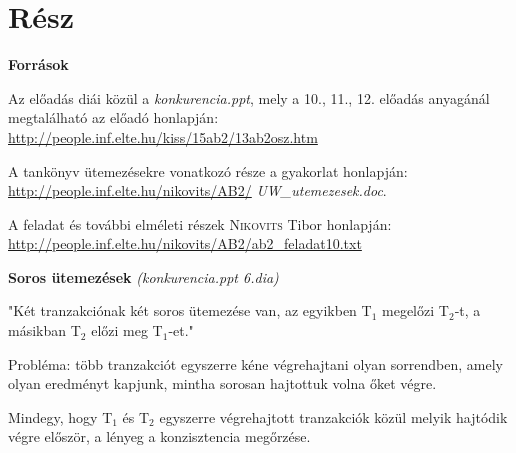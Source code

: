 \documentclass[a4paper,11.5pt, table]{article}
\begin{document}
\newpage

	\section{Rész}

	\textbf{Források}
	\begin{compactitem}
		\item Az előadás diái közül a \textit{konkurencia.ppt}, mely a 10., 11., 12. előadás anyagánál megtalálható az előadó honlapján: \url{http://people.inf.elte.hu/kiss/15ab2/13ab2osz.htm}
		 \item A tankönyv ütemezésekre vonatkozó része a gyakorlat honlapján: \url{http://people.inf.elte.hu/nikovits/AB2/} \textit{UW\_utemezesek.doc}.
		\item A feladat és további elméleti részek \textsc{Nikovits} Tibor honlapján: \url{http://people.inf.elte.hu/nikovits/AB2/ab2_feladat10.txt}
	\end{compactitem}

	\textbf{Soros ütemezések} \textit{(konkurencia.ppt 6.dia)}
	\begin{compactitem}
		\item "Két tranzakciónak két soros ütemezése van, az egyikben T$_{1}$ megelőzi T$_{2}$‑t, a másikban T$_{2}$ előzi meg T$_{1}$-et."
		
		\item Probléma: több tranzakciót egyszerre kéne végrehajtani olyan sorrendben, amely olyan eredményt kapjunk, mintha sorosan hajtottuk volna őket végre.
		
		\item Mindegy, hogy T$_{1}$ és T$_{2}$ egyszerre végrehajtott tranzakciók közül melyik hajtódik végre először, a lényeg a konzisztencia megőrzése.		
	\end{compactitem}
\end{document}
